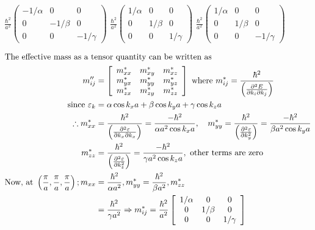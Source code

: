 \begin{enumerate}
\begin{tasks}
		\task[\textbf{B.}]  $\frac{\hbar^{2}}{a^{2}}\left(\begin{array}{ccc}-1 / \alpha & 0 & 0 \\ 0 & -1 / \beta & 0 \\ 0 & 0 & -1 / \gamma\end{array}\right)$
		\task[\textbf{C.}] $\frac{\hbar^{2}}{a^{2}}\left(\begin{array}{ccc}1 / \alpha & 0 & 0 \\ 0 & 1 / \beta & 0 \\ 0 & 0 & 1 / \gamma\end{array}\right)$
		\task[\textbf{D.}] $\frac{\hbar^{2}}{a^{2}}\left(\begin{array}{ccc}1 / \alpha & 0 & 0 \\ 0 & 1 / \beta & 0 \\ 0 & 0 & -1 / \gamma\end{array}\right)$
	\end{tasks}
	\begin{answer}
		\begin{align*}
		\intertext{The effective mass as a tensor quantity can be written as}
		m_{i j}^{\prime \prime}&=\left[\begin{array}{ccc}m_{x x}^{*} & m_{x y}^{*} & m_{x z}^{*} \\ m_{y x}^{*} & m_{y y}^{*} & m_{y z}^{*} \\ m_{z x}^{*} & m_{z y}^{*} & m_{z z}^{*}\end{array}\right]\text{ where }m_{i j}^{*}=\frac{\hbar^{2}}{\left(\frac{\partial^{2} E}{\partial k_{i} \partial k_{j}}\right)}\\
		\text{since }\varepsilon_{k}&=\alpha \cos k_{x} a+\beta \cos k_{y} a+\gamma \cos k_{z} a\\
		\therefore m_{x x}^{*}&=\frac{\hbar^{2}}{\left(\frac{\partial^{2} \varepsilon}{\partial k_{x} \partial k_{x}}\right)}=\frac{-\hbar^{2}}{\alpha a^{2} \cos k_{x} a}, \quad m_{y y}^{*}=\frac{\hbar^{2}}{\left(\frac{\partial^{2} \varepsilon}{\partial k_{y}^{2}}\right)}=\frac{-\hbar^{2}}{\beta a^{2} \cos k_{y} a}\\
		m_{z z}^{*}&=\frac{\hbar^{2}}{\left(\frac{\partial^{2} \varepsilon}{\partial k_{z}^{2}}\right)}=\frac{-\hbar^{2}}{\gamma a^{2} \cos k_{z} a}, \text{ other terms are zero}\\
		\text{Now, at }\left(\frac{\pi}{a}, \frac{\pi}{a}, \frac{\pi}{a}\right) ; m_{x x}&=\frac{\hbar^{2}}{\alpha a^{2}}, m_{y y}^{*}=\frac{\hbar^{2}}{\beta a^{2}}, m_{z z}^{*}\\&=\frac{\hbar^{2}}{\gamma a^{2}} \Rightarrow m_{i j}^{*}=\frac{\hbar^{2}}{a^{2}}\left[\begin{array}{ccc}1 / \alpha & 0 & 0 \\ 0 & 1 / \beta & 0 \\ 0 & 0 & 1 / \gamma\end{array}\right]

\end{align*}
\end{answer}
\end{enumerate}
